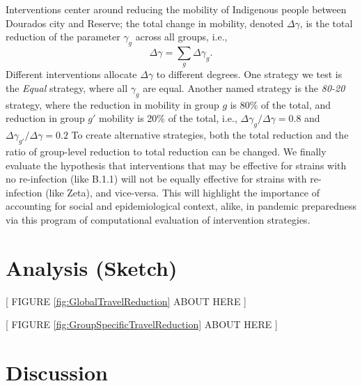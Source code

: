 \documentclass[
  letterpaper,
  abstract]{scrartcl}
\begin{document}
Interventions center around reducing the mobility of Indigenous people between
Dourados city and Reserve; the total change in mobility, denoted $\Delta
\gamma$, is the total reduction of the parameter $\gamma_g$ across all 
groups, i.e., 
\begin{equation}
  \Delta \gamma = \sum_g \Delta \gamma_g.
\end{equation}
\noindent
Different interventions allocate $\Delta \gamma$ to different degrees. 
One strategy we test is the \emph{Equal} strategy, where all $\gamma_g$ are
equal. Another named strategy is the \emph{80-20} strategy, where the
reduction in mobility in group $g$ is 80\% of the total, and reduction in
group $g'$ mobility is 20\% of the total, i.e., $\Delta\gamma_g / \Delta\gamma =
0.8$ and $\Delta\gamma_{g'} / \Delta\gamma = 0.2$ To create alternative
strategies, both the total reduction and the ratio of group-level reduction to 
total reduction can be changed. We finally evaluate the hypothesis that
interventions that may be effective for strains with no re-infection (like
B.1.1) will not be equally effective for strains with re-infection (like Zeta),
and vice-versa. This will highlight the importance of accounting for social and
epidemiological context, alike, in pandemic preparedness via this program of
computational evaluation of intervention strategies.


\section{Analysis (Sketch)}\label{analysis-sketch}

\vspace{0.5em}
\begin{center}
{[ FIGURE \ref{fig:GlobalTravelReduction} ABOUT HERE ]} \\
\end{center}


\vspace{0.5em}
\begin{center}
{[ FIGURE \ref{fig:GroupSpecificTravelReduction} ABOUT HERE ]} \\
\end{center}


\section{Discussion}\label{discussion}
\end{document}

